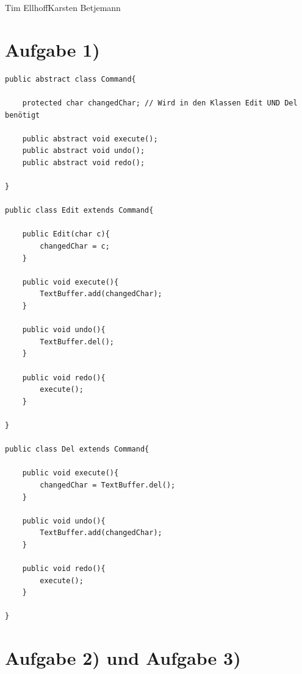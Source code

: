 \documentclass{swp1}
\begin{document}
          {Tim Ellhoff}{Karsten Betjemann}{}
          
\section*{Aufgabe 1)}

\begin{lstlisting}
public abstract class Command{
	
	protected char changedChar; // Wird in den Klassen Edit UND Del benötigt
	
	public abstract void execute();
	public abstract void undo();
	public abstract void redo();

}

public class Edit extends Command{
	
	public Edit(char c){
		changedChar = c;
	}
	
	public void execute(){
		TextBuffer.add(changedChar);
	}
	
	public void undo(){
		TextBuffer.del();
	}
	
	public void redo(){
		execute();
	}

}

public class Del extends Command{
	
	public void execute(){
		changedChar = TextBuffer.del();
	}
	
	public void undo(){
		TextBuffer.add(changedChar);
	}
	
	public void redo(){
		execute();
	}

}
\end{lstlisting}


\section*{Aufgabe 2) und Aufgabe 3)}
\end{document}
